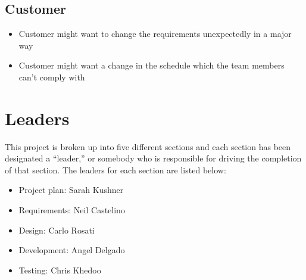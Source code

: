 \documentclass[12pt]{article}
\begin{document}
\subsection{Customer}
\begin{itemize}
 \item Customer might want to change the requirements unexpectedly in a major way
 \item Customer might want a change in the schedule which the team members can’t comply with
\end{itemize}

\section{Leaders}
This project is broken up into five different sections and each section has been designated a ``leader,” or somebody who is responsible for driving the completion of that section. The leaders for each section are listed below:
\begin{itemize}
 \item Project plan: Sarah Kushner
 \item Requirements: Neil Castelino
 \item Design: Carlo Rosati
 \item Development: Angel Delgado
 \item Testing: Chris Khedoo
\end{itemize}
\end{document}
